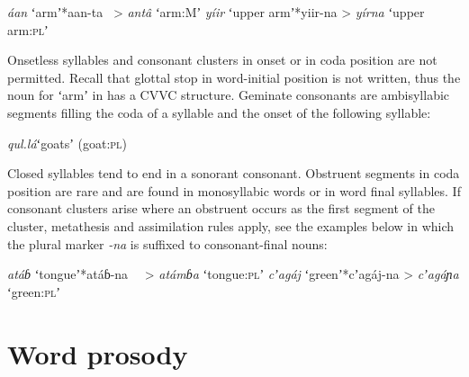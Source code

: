 \documentclass[output=paper,modfonts,nonflat,hidelinks]{langsci/langscibook}
\begin{document}
\begin{exe}
	\ex \textit{áan}\hspace{9mm} ʻarmʼ\hspace{15mm}*aan-ta \ >\hspace{8mm} \textit{antâ}\hspace{8mm} ʻarm:Mʼ \label{ex:Petrollino:arm}
    \ex \textit{yíir}\hspace{9mm} ʻupper armʼ\hspace{5mm}*yiir-na >\hspace{7mm} \textit{yírna}\hspace{7mm} ʻupper arm:\textsc{pl}ʼ \label{ex:Petrollino:yiir}
\end{exe}

Onsetless syllables and consonant clusters in onset or in coda position are not permitted. Recall that glottal stop in word-initial position is not written, thus the noun for ʻarmʼ in  has a CVVC structure. Geminate consonants are ambisyllabic segments filling the coda of a syllable and the onset of the following syllable:

\begin{exe}
	\ex \textit{qul.lá}\hspace{8mm}ʻgoatsʼ (goat:\textsc{pl}) \label{ex:Petrollino:qul.lá}
\end{exe}

Closed syllables tend to end in a sonorant consonant. Obstruent segments in coda position are rare and are found in monosyllabic words or in word final syllables. If consonant clusters arise where an obstruent occurs as the first segment of the cluster, metathesis and assimilation rules apply, see the examples below in which the plural marker \textit{-na} is suffixed to consonant-final nouns:  

\begin{exe}
	\ex \textit{atáɓ}\hspace{9mm} ʻtongueʼ\hspace{10mm}*atáɓ-na \ \ >\hspace{6mm} \textit{atámɓa}\hspace{4mm} ʻtongue:\textsc{pl}ʼ
    \ex \textit{cʼagáj}\hspace{7mm} ʻgreenʼ\hspace{12mm}*cʼagáj-na >\hspace{6mm} \textit{cʼagáɲa}\hspace{4mm} ʻgreen:\textsc{pl}ʼ
\end{exe}

\section{Word prosody} \label{sec:Petrollino:3}
\end{document}
